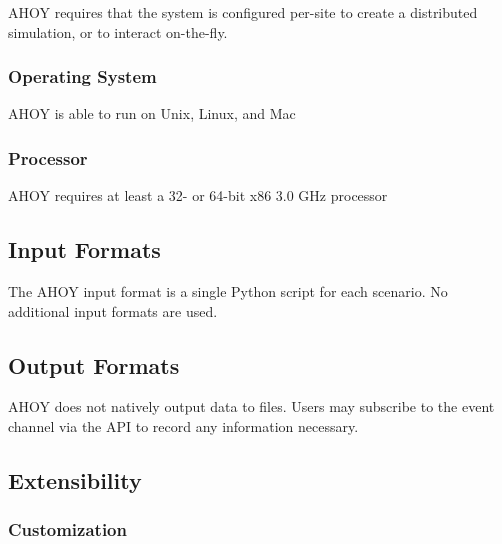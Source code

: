 \documentclass[titlepage]{article}
\begin{document}
AHOY requires that the system is configured per-site to create a distributed simulation, or to interact on-the-fly.


\subsubsection{Operating System%
  \label{operating-system}%
}

AHOY is able to run on Unix, Linux, and Mac


\subsubsection{Processor%
  \label{processor}%
}

AHOY requires at least a 32- or 64-bit x86 3.0 GHz processor


\subsection{Input Formats%
  \label{input-formats}%
}

The AHOY input format is a single Python script for each scenario.  No additional input formats are used.


\subsection{Output Formats%
  \label{output-formats}%
}

AHOY does not natively output data to files.  Users may subscribe to the event channel via the API to record any information necessary.

\subsection{Extensibility%
  \label{extensibility}%
}
\subsubsection{Customization}
\end{document}
